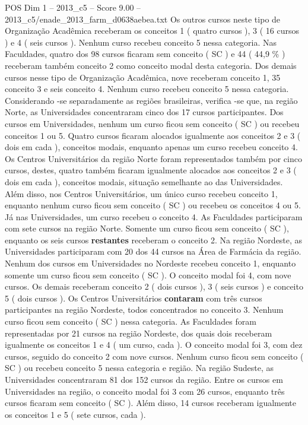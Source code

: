 \begin{textsample}{POS Dim 1 – 2013\_c5 – Score 9.00 – 2013\_c5/enade\_2013\_farm\_d0638aebea.txt}
Os outros cursos neste tipo de Organização Acadêmica receberam os conceitos 1 ( quatro cursos ), 3 ( 16 cursos ) e 4 ( seis cursos ).
Nenhum curso recebeu conceito 5 nessa categoria.
Nas Faculdades, quatro dos 98 cursos ficaram sem conceito ( SC ) e 44 ( 44,9 \% ) receberam também conceito 2 como conceito modal desta categoria.
Dos demais cursos nesse tipo de Organização Acadêmica, nove receberam conceito 1, 35 conceito 3 e seis conceito 4.
Nenhum curso recebeu conceito 5 nessa categoria.
Considerando -se separadamente as regiões brasileiras, verifica -se que, na região Norte, as Universidades concentraram cinco dos 17 cursos participantes.
Dos cursos em Universidades, nenhum um curso ficou sem conceito ( SC ) ou recebeu conceitos 1 ou 5.
Quatro cursos ficaram alocados igualmente aos conceitos 2 e 3 ( dois em cada ), conceitos modais, enquanto apenas um curso recebeu conceito 4.
Os Centros Universitários da região Norte foram representados também por cinco cursos, destes, quatro também ficaram igualmente alocados aos conceitos 2 e 3 ( dois em cada ), conceitos modais, situação semelhante ao das Universidades.
Além disso, nos Centros Universitários, um único curso recebeu conceito 1, enquanto nenhum curso ficou sem conceito ( SC ) ou recebeu os conceitos 4 ou 5.
Já nas Universidades, um curso recebeu o conceito 4.
As Faculdades participaram com sete cursos na região Norte.
Somente um curso ficou sem conceito ( SC ), enquanto os seis cursos \textbf{restantes} receberam o conceito 2.
Na região Nordeste, as Universidades participaram com 20 dos 44 cursos na Área de Farmácia da região.
Nenhum dos cursos em Universidades no Nordeste recebeu conceito 1, enquanto somente um curso ficou sem conceito ( SC ).
O conceito modal foi 4, com nove cursos.
Os demais receberam conceito 2 ( dois cursos ), 3 ( seis cursos ) e conceito 5 ( dois cursos ).
Os Centros Universitários \textbf{contaram} com três cursos participantes na região Nordeste, todos concentrados no conceito 3.
Nenhum curso ficou sem conceito ( SC ) nessa categoria.
As Faculdades foram representadas por 21 cursos na região Nordeste, dos quais dois receberam igualmente os conceitos 1 e 4 ( um curso, cada ).
O conceito modal foi 3, com dez cursos, seguido do conceito 2 com nove cursos.
Nenhum curso ficou sem conceito ( SC ) ou recebeu conceito 5 nessa categoria e região.
Na região Sudeste, as Universidades concentraram 81 dos 152 cursos da região.
Entre os cursos em Universidades na região, o conceito modal foi 3 com 26 cursos, enquanto três cursos ficaram sem conceito ( SC ).
Além disso, 14 cursos receberam igualmente os conceitos 1 e 5 ( sete cursos, cada ).

\end{textsample}
